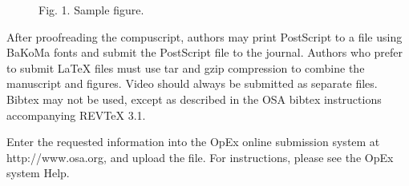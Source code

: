 \begin{figure}
\epsfxsize=4.2in 
\begin{center} 
{\footnotesize Fig. 1. Sample figure.}
\end{center}
\end{figure}

After proofreading the compuscript, authors may print  
PostScript to a file using BaKoMa fonts and submit the 
PostScript file to the journal.  Authors who prefer to
submit LaTeX files must use tar and gzip compression
to combine the manuscript and figures.  Video should
always be submitted as separate files. Bibtex may not 
be used, except as described in the OSA bibtex 
instructions accompanying REVTeX 3.1.


Enter the requested 
information into the OpEx online submission system at 
http://www.osa.org, and upload the file.  For 
instructions, please see the OpEx system Help.

